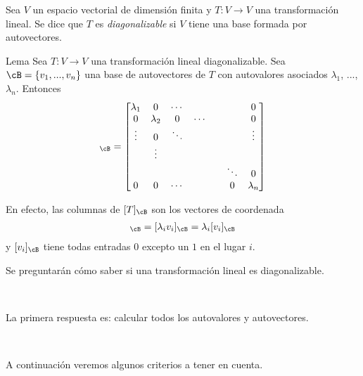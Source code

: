 \documentclass{beamer} %
\begin{document}
\begin{frame}
    \begin{definicion}
        Sea $V$ un espacio vectorial de dimensión finita y $T:V\longrightarrow V$ una transformación lineal. Se dice que $T$ es \textit{diagonalizable} si $V$ tiene una base formada por autovectores.
    \end{definicion}
    
    
\end{frame}

\begin{frame}
    
    \begin{block}{Lema}
        Sea $T:V\longrightarrow V$ una transformación lineal diagonalizable. Sea $\cB=\{v_1, ..., v_n\}$ una base de autovectores de $T$ con autovalores asociados $\lambda_1$, ..., $\lambda_n$. Entonces 
        \begin{align*}
            [T]_\cB=
            \begin{bmatrix}
                \lambda_1 & 0 & \cdots & & &  & 0\\ 
                0 & \lambda_2 & 0& \cdots & &  & 0\\
                \vdots & 0 & \ddots & & &  & \vdots\\
                & \vdots &  & & & &  \\
                & &  & & &  \ddots&0\\
                0 & 0 & \cdots & & & 0 & \lambda_{n}
            \end{bmatrix}
        \end{align*}
    \end{block}
    
    En efecto, las columnas de $[T]_\cB$ son los vectores de coordenada
    \begin{align*}
        [T(v_i)]_\cB=[\lambda_i v_i]_\cB=\lambda_i[v_i]_\cB
    \end{align*}
    y $[v_i]_\cB$ tiene todas entradas $0$ excepto un $1$ en el lugar $i$.
    
\end{frame}

\begin{frame}
    Se preguntarán cómo saber si una transformación lineal es diagonalizable.\pause
    
    \
    
    La primera respuesta es: calcular todos los autovalores y autovectores.\pause
    
    \
    
    A continuación veremos algunos criterios a tener en cuenta.\pause
\end{frame}
\end{document}
